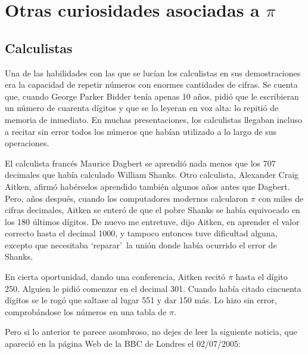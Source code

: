\section*{Otras curiosidades asociadas a \texorpdfstring{$\pi$}{pi}}
\subsection*{Calculistas}
Una de las habilidades con las que se lucían los calculistas en sus demostraciones era la capacidad de repetir números 
con enormes cantidades de cifras. Se cuenta que, cuando George Parker Bidder tenía apenas 10 años, pidió que le escribieran 
un número de cuarenta dígitos y que se lo leyeran en voz alta: lo repitió de memoria de inmediato. 
En muchas presentaciones, los calculistas llegaban incluso a recitar sin error todos los números que habían utilizado 
a lo largo de sus operaciones.

El calculista francés Maurice Dagbert se aprendió nada menos que los 707 decimales que había calculado William Shanks. 
Otro calculista, Alexander Craig Aitken, afirmó habérselos aprendido también algunos años antes que Dagbert. Pero, 
años después, cuando los computadores modernos calcularon $\pi$ con miles de cifras decimales, Aitken se enteró de 
que el pobre Shanks se había equivocado en los 180 últimos dígitos. \guillemotleft De nuevo me entretuve\guillemotright, 
dijo Aitken, \guillemotleft en aprender el valor correcto hasta el decimal 1000, y tampoco entonces tuve dificultad alguna, 
excepto que necesitaba \textquoteleft reparar\textquoteright\ la unión donde había ocurrido el error de Shanks\guillemotright.

En cierta oportunidad, dando una conferencia, Aitken recitó $\pi$ hasta el dígito 250. Alguien le pidió comenzar en el decimal 301. 
Cuando había citado cincuenta dígitos se le rogó que saltase al lugar 551 y dar 150 más. Lo hizo sin error, comprobándose 
los números en una tabla de $\pi$.

Pero si lo anterior te parece asombroso, no dejes de leer la siguiente noticia, que apareció en la página Web de la BBC de Londres el 02/07/2005:

